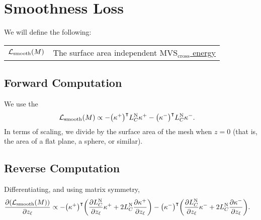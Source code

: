 

\section{Smoothness Loss}

We will define the following: \begin{center}\begin{tabular}{r|l}
	\(\mathcal{L}_{\mathrm{smooth}}\pof{M}\) & The surface area independent \href{http://graphics.berkeley.edu/papers/Joshi-EMC-2007-06/Joshi-EMC-2007-06.pdf}{\(\text{MVS}_{\text{cross}}\) energy}
\end{tabular}\end{center}

\subsection{Forward Computation}
We use the  \begin{align*}
	\mathcal{L}_{\mathrm{smooth}}\pof{M} &\propto -\pof{\kappa^+}^\intercal L_C^{\text{N}}\kappa^+ - \pof{\kappa^-}^\intercal L_C^{\text{N}}\kappa^-.
\end{align*} In terms of scaling, we divide by the surface area of the mesh when \(z = 0\) (that is, the area of a flat plane, a sphere, or similar).

\subsection{Reverse Computation}
Differentiating, and using matrix symmetry, \begin{align*}
	\frac{\partial\pof{\mathcal{L}_{\mathrm{smooth}}\pof{M}}}{\partial z_\ell} &\propto -\pof{\kappa^+}^\intercal\pof{\frac{\partial L_C^{\text{N}}}{\partial z_\ell}\kappa^+ + 2L_C^{\text{N}}\frac{\partial\kappa^+}{\partial z_\ell}} - \pof{\kappa^-}^\intercal\pof{\frac{\partial L_C^{\text{N}}}{\partial z_\ell}\kappa^- + 2L_C^{\text{N}}\frac{\partial\kappa^-}{\partial z_\ell}}.
\end{align*}
